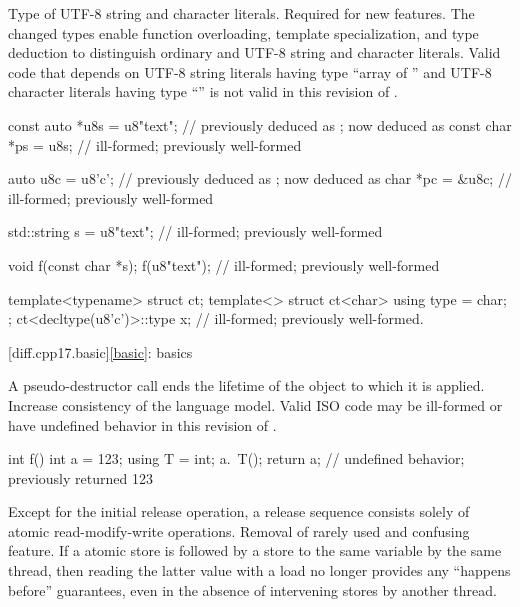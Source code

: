 \change
Type of UTF-8 string and character literals.
\rationale
Required for new features.
The changed types enable function overloading, template specialization, and
type deduction to distinguish ordinary and UTF-8 string and character literals.
\effect
Valid \CppXVII{} code that depends on
UTF-8 string literals having type ``array of '' and
UTF-8 character literals having type ``''
is not valid in this revision of \Cpp{}.
\begin{codeblock}
const auto *u8s = u8"text";     //  previously deduced as ; now deduced as 
const char *ps = u8s;           // ill-formed; previously well-formed

auto u8c = u8'c';               //  previously deduced as ; now deduced as 
char *pc = &u8c;                // ill-formed; previously well-formed

std::string s = u8"text";       // ill-formed; previously well-formed

void f(const char *s);
f(u8"text");                    // ill-formed; previously well-formed

template<typename> struct ct;
template<> struct ct<char> {
  using type = char;
};
ct<decltype(u8'c')>::type x;    // ill-formed; previously well-formed.
\end{codeblock}

[diff.cpp17.basic]{\ref{basic}: basics}

\change
A pseudo-destructor call ends the lifetime of
the object to which it is applied.
\rationale
Increase consistency of the language model.
\effect
Valid ISO \CppXVII{} code may be ill-formed or
have undefined behavior in this revision of \Cpp{}.
\begin{example}
\begin{codeblock}
int f() {
  int a = 123;
  using T = int;
  a.~T();
  return a;         // undefined behavior; previously returned 123
}
\end{codeblock}
\end{example}

\change
Except for the initial release operation,
a release sequence consists solely of atomic read-modify-write operations.
\rationale
Removal of rarely used and confusing feature.
\effect
If a  atomic store is followed
by a  store to the same variable by the same thread,
then reading the latter value with a  load
no longer provides any ``happens before'' guarantees,
even in the absence of intervening stores by another thread.

